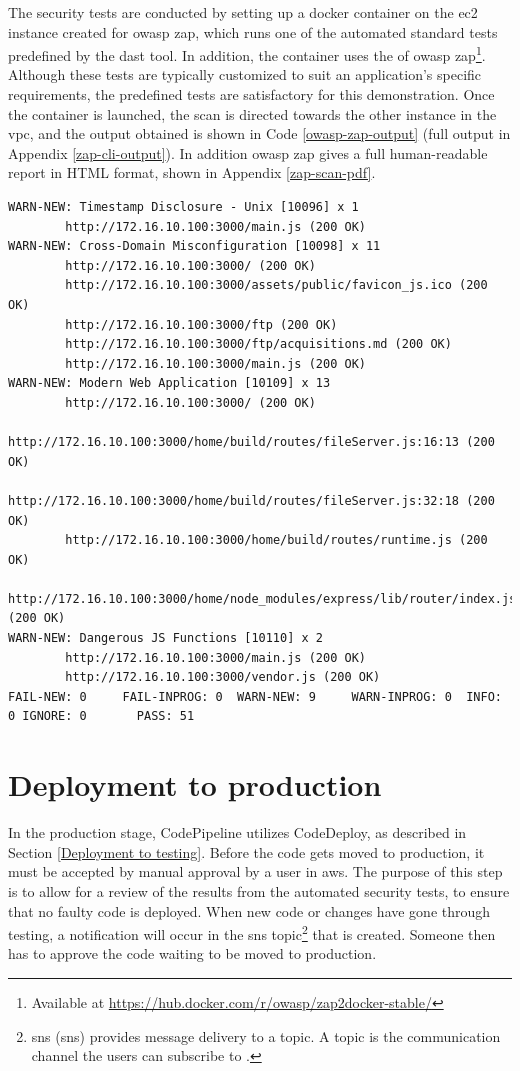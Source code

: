 The security tests are conducted by setting up a docker container on the \acrshort{ec2} instance created for \acrshort{owasp} \acrshort{zap}, which runs one of the automated standard tests predefined by the \acrshort{dast} tool. In addition, the container uses the  of \acrshort{owasp} \acrshort{zap}\footnote{Available at \url{https://hub.docker.com/r/owasp/zap2docker-stable/}}. Although these tests are typically customized to suit an application's specific requirements, the predefined tests are satisfactory for this demonstration. Once the container is launched, the scan is directed towards the other instance in the \acrshort{vpc}, and the output obtained is shown in Code \ref{owasp-zap-output} (full output in Appendix \ref{zap-cli-output}). In addition \acrshort{owasp} \acrshort{zap} gives a full human-readable report in HTML format, shown in Appendix \ref{zap-scan-pdf}.
\newpage
\vspace{2mm}
\begin{lstlisting}[caption=The output of an OWASP ZAP baseline scan, captionpos=b, frame=single, label={owasp-zap-output}]
WARN-NEW: Timestamp Disclosure - Unix [10096] x 1
        http://172.16.10.100:3000/main.js (200 OK)
WARN-NEW: Cross-Domain Misconfiguration [10098] x 11
        http://172.16.10.100:3000/ (200 OK)
        http://172.16.10.100:3000/assets/public/favicon_js.ico (200 OK)
        http://172.16.10.100:3000/ftp (200 OK)
        http://172.16.10.100:3000/ftp/acquisitions.md (200 OK)
        http://172.16.10.100:3000/main.js (200 OK)
WARN-NEW: Modern Web Application [10109] x 13
        http://172.16.10.100:3000/ (200 OK)
        http://172.16.10.100:3000/home/build/routes/fileServer.js:16:13 (200 OK)
        http://172.16.10.100:3000/home/build/routes/fileServer.js:32:18 (200 OK)
        http://172.16.10.100:3000/home/build/routes/runtime.js (200 OK)
        http://172.16.10.100:3000/home/node_modules/express/lib/router/index.js:280:10 (200 OK)
WARN-NEW: Dangerous JS Functions [10110] x 2
        http://172.16.10.100:3000/main.js (200 OK)
        http://172.16.10.100:3000/vendor.js (200 OK)
FAIL-NEW: 0     FAIL-INPROG: 0  WARN-NEW: 9     WARN-INPROG: 0  INFO: 0 IGNORE: 0       PASS: 51
\end{lstlisting}

\newpage
\section{Deployment to production}
In the production stage, CodePipeline utilizes CodeDeploy, as described in Section \ref{Deployment to testing}. Before the code gets moved to production, it must be accepted by manual approval by a user in \acrshort{aws}. The purpose of this step is to allow for a review of the results from the automated security tests, to ensure that no faulty code is deployed. When new code or changes have gone through testing, a notification will occur in the \acrshort{sns} topic\footnote{\acrlong{sns} (\acrshort{sns}) provides message delivery to a topic. A topic is the communication channel the users can subscribe to \cite{SNStopic}.} that is created. Someone then has to approve the code waiting to be moved to production.

